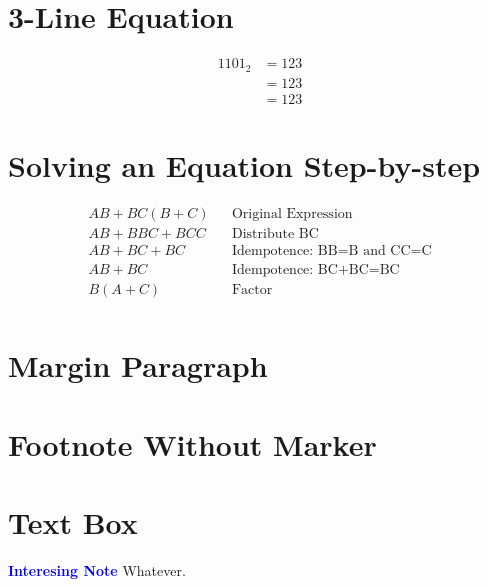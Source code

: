 \section{3-Line Equation}
\begin{align}
	\label{03:eq:identity_example}
	1101_2 &= 123 \\
	\nonumber
	&= 123 \\
	\nonumber
	&= 123
\end{align}


\section{Solving an Equation Step-by-step}
\begin{align}
	\label{04:soln:solving_equation_one}
	AB+BC(B+C) && \text{Original Expression} \\
	\nonumber
	AB+BBC+BCC && \text{Distribute BC} \\
	\nonumber
	AB+BC+BC && \text{Idempotence: BB=B and CC=C} \\
	\nonumber
	AB+BC && \text{Idempotence: BC+BC=BC} \\
	\nonumber
	B(A+C) && \text{Factor} \\
\end{align}

\section{Margin Paragraph} 

\section{Footnote Without Marker} 

\section{Text Box}
\begin{tcolorbox}[colback=blue!5!white,colframe=blue!75!black]
	\textcolor{blue}{\textbf{Interesing Note}}
	\tcblower
	Whatever.
\end{tcolorbox}

